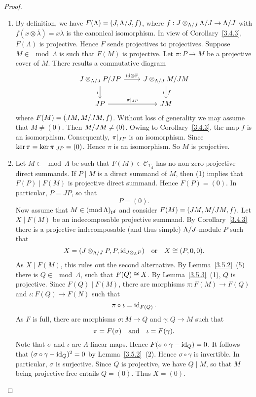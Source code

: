 \begin{proof}\
\begin{enumerate}
\item By definition, we have $F(\Lambda) = (J, \Lambda/J, f)$, where $f: J \otimes_{\Lambda/J} \Lambda/J \to \Lambda/J$ with $f(x \otimes \overline \lambda)=x\lambda$ is the canonical isomorphism. In view of Corollary~\ref{3.4.3}, $F(\Lambda)$ is projective. Hence $F$ sends projectives to projectives. Suppose $M \in \mod \Lambda$ is such that $F(M)$ is projective. Let $\pi : P \to M$ be a projective cover of $M$. There results a commutative diagram
\[\begin{tikzcd}
J \otimes_{\factor \Lambda {J}} \factor P {JP} \rar["{\id} \otimes \overline \pi"] \dar["\wr"'] & J \otimes_{\factor \Lambda {J}} \factor M {J M} \dar["\wr"', "f"] \\
JP \rar["\restr \pi {J P}"]& J M
\end{tikzcd}\]
where $F(M) = (J M, M/J M, f)$. Without loss of generality we may assume that $M \neq (0)$. Then $M/J M \neq (0)$. Owing to
Corollary~\ref{3.4.3}, the map $f$ is an isomorphism. Consequently, ${\pi}|_{JP}$ is an isomorphism. Since $\ker \pi = \ker {\pi}|_{J P} = (0)$.
Hence $\pi$ is an isomorphism. So $M$ is projective.

\item Let $M \in \mod \Lambda$ be such that $F(M) \in \mathcal{C}_{T_\Lambda}$ has no non-zero projective direct summands. If $P \mid M$ is a direct summand of $M$, then (1) implies that $F(P) \mid F(M)$ is projective direct summand. Hence $F(P) = (0)$.
In particular, $P = J P$, so that
\[
P = (0).
\]
Now assume that $M \in (\operatorname{mod} \Lambda)_{\mathrm{pf}}$ and consider $F(M) = (J M, M/JM, f)$. Let $X \mid F(M)$ be an indecomposable
projective summand. By Corollary~\ref{3.4.3} there is a projective indecomposable (and thus simple) $\Lambda/J$-module $P$ such that
\[
X = (J \otimes_{\Lambda/J}
P, P, \operatorname{id}_{J\otimes_\Lambda P})
\quad\text{or}\quad
X \cong (P, 0, 0).
\]
As $X \mid F(M)$, this rules out the second alternative. By Lemma~\ref{3.5.2}~(5) there is $Q \in \mod \Lambda$, such that $F(Q)
\cong X$. By Lemma~\ref{3.5.3}~(1), $Q$ is projective. Since $F(Q) \mid F(M)$, there are morphisms $\pi: F(M) \to F(Q)$ and $\iota: F(Q) \to F(N)$ such that
\[
\pi \circ \iota = \operatorname{id}_{F(Q)}.
\]
As $F$ is full, there are morphisms $\sigma: M \to Q$ and $\gamma: Q \to M$ such that
\[
\pi = F(\sigma) \quad\text{and}\quad
\iota = F(\gamma).
\]
 Note that $\sigma$ and $\iota$ are $\Lambda$-linear maps. Hence $F(\sigma \circ \gamma - \operatorname{id}_Q) = 0$. It follows that $(\sigma \circ \gamma - \operatorname{id}_Q)^2 = 0$ by Lemma~\ref{3.5.2}~(2). Hence $\sigma \circ \gamma$ is invertible. In particular, $\sigma$ is surjective. Since $Q$ is projective, we have $Q \mid
M$, so that $M$ being projective free entails $Q = (0)$. Thus $X = (0)$.\qedhere
\end{enumerate}
\end{proof}

